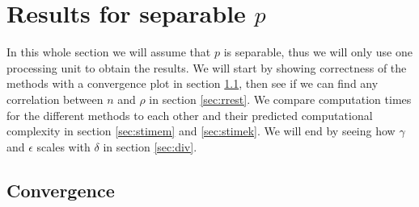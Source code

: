 \chapter{Results for separable $p$}%
In this whole section we will assume that $p$ is separable, thus we will only use one processing unit to obtain the results. 
We will start by showing correctness of the methods with a convergence plot in section \ref{sec:sconv}, then see if we can find any correlation between $n$ and $\rho$ in section \ref{sec:rrest}.
We compare computation times for the different methods to each other and their predicted computational complexity in section \ref{sec:stimem} and \ref{sec:stimek}.
We will end by seeing how $\gamma$ and $\epsilon$ scales with $\delta$ in section \ref{sec:div}.
\section{Convergence} \label{sec:sconv}



